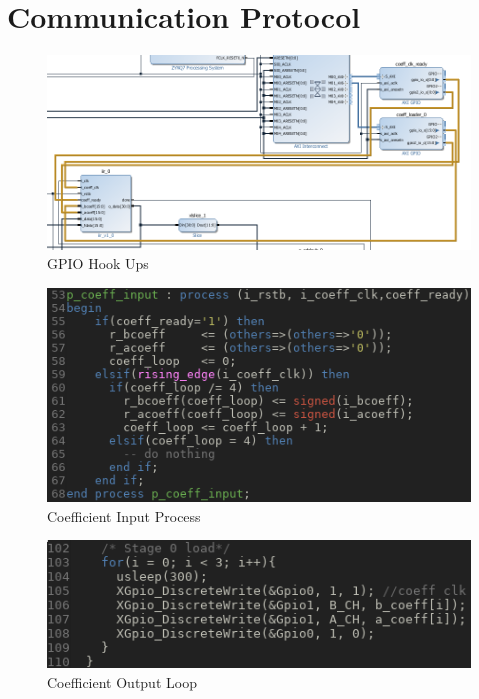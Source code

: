 \documentclass[12pt,a4paper,titlepage]{article}
\begin{document}
\section{Communication Protocol}
\begin{figure}[!htb]
  \centering
  \includegraphics[width=\textwidth]
                  {../presentation/zynq-communication-design.png}
                  \caption{GPIO Hook Ups}
                  \label{fig:b0}
\end{figure}
\begin{figure}[!htb]
  \centering
  \includegraphics[width=\textwidth]
                  {../presentation/coeff.png}
                  \caption{Coefficient Input Process}
                  \label{fig:b1}
\end{figure}
\begin{figure}[!htb]
  \centering
  \includegraphics[width=\textwidth]
                  {../presentation/zynq-coeff.png}
                  \caption{Coefficient Output Loop}
                  \label{fig:b2}
\end{figure}

\newpage

\end{document}

